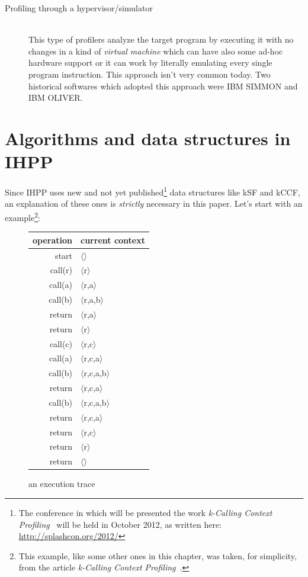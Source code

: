 \documentclass[a4paper,11pt]{report}
\begin{document}
\begin{description}
\begin{description}
\end{description} 

\item[Profiling through a hypervisor/simulator] \hfill \\
This type of profilers analyze the target program by executing it with no
changes in a kind of \emph{virtual machine} which can have also some ad-hoc
hardware support or it can work by literally emulating every single program
instruction. This approach isn't very common today. Two historical softwares
which adopted this approach were IBM SIMMON and IBM OLIVER.

\end{description}

\chapter{Algorithms and data structures in IHPP}
Since IHPP uses new and not yet published\footnote{The conference in which will be presented the work \emph{k-Calling Context
Profiling}~\cite{kCCF} will be held in October 2012, as written here:
\mbox{\url{http://splashcon.org/2012/}}} data structures like kSF and kCCF, an
explanation of these ones is \emph{strictly} necessary in this paper.
Let's start with an example\footnote{This example, like some other ones in this chapter, was taken, for simplicity, from the article \emph{k-Calling Context Profiling}~\cite{kCCF}.}: 

\begin{figure}
\begin{center}
\begin{tabular}{r|l}
\textbf{operation} & \textbf{current context} \\
\hline
start & $\langle$$\rangle$ \\
call(r) & $\langle$r$\rangle$ \\
call(a) & $\langle$r,a$\rangle$ \\
call(b) & $\langle$r,a,b$\rangle$ \\
return & $\langle$r,a$\rangle$ \\
return & $\langle$r$\rangle$ \\
call(c) & $\langle$r,c$\rangle$ \\
call(a) & $\langle$r,c,a$\rangle$ \\
call(b) & $\langle$r,c,a,b$\rangle$ \\
return & $\langle$r,c,a$\rangle$ \\
call(b) & $\langle$r,c,a,b$\rangle$ \\
return & $\langle$r,c,a$\rangle$ \\
return & $\langle$r,c$\rangle$ \\
return & $\langle$r$\rangle$ \\
return & $\langle$$\rangle$ \\

\end{tabular}
\caption{an execution trace}
\label{callex1}
\end{center}
\end{figure}
\end{document}
